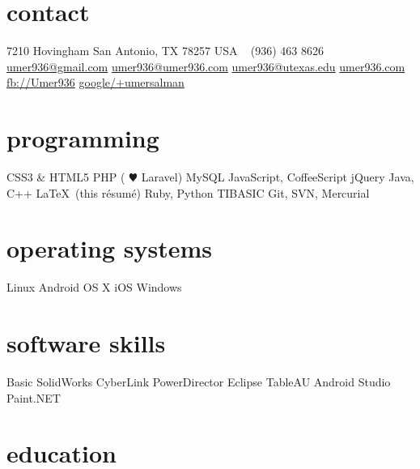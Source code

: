 \documentclass[]{friggeri-cv} %
\begin{document}


\begin{aside} %
	\section{contact}
	7210 Hovingham
	San Antonio, TX 78257
	USA
	~
	(936) 463 8626
	~
	\href{mailto:umer936@gmail.com}{umer936@gmail.com}
	\href{mailto:umer936@umer936.com}{umer936@umer936.com}
	\href{mailto:umer936@utexas.edu}{umer936@utexas.edu}
	\href{http://umer936.com}{umer936.com}
	\href{http://facebook.com/Umer936}{fb://Umer936}
	\href{http://google.com/+umersalman}{google/+umersalman}
	~
	\section{programming}
	CSS3 \& HTML5
	PHP ({\color{red} $\varheartsuit$} Laravel)
	MySQL
	JavaScript, CoffeeScript
	jQuery
	Java, C++
	\LaTeX \ (this r\'esum\'e)
	Ruby, Python
	TIBASIC
	Git, SVN, Mercurial
	~
	\section{operating systems}
	Linux
	Android
	OS X
	iOS
	Windows
	~
	\section{software skills}
	Basic SolidWorks
	CyberLink PowerDirector
	Eclipse
	TableAU
	Android Studio
	Paint.NET
\end{aside}


\section{education}
\end{document}
